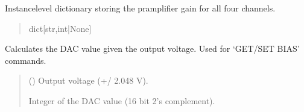 \documentclass[letterpaper,10pt,english]{sphinxmanual}
\begin{document}
\begin{fulllineitems}
\begin{fulllineitems}
\begin{quote}
\begin{description}
\end{description}\end{quote}

\end{fulllineitems}


\begin{fulllineitems}
\label{\detokenize{PodDevice_8401HR:PodDevice_8401HR.POD_8401HR._preampGain}}
\pysigstartsignatures
{}
\pysigstopsignatures
\sphinxAtStartPar
Instance\sphinxhyphen{}level dictionary storing the pramplifier gain for             all four channels.
\begin{quote}\begin{description}
\sphinxAtStartPar
dict{[}str,int|None{]}

\end{description}\end{quote}

\end{fulllineitems}


\begin{fulllineitems}
\label{\detokenize{PodDevice_8401HR:PodDevice_8401HR.POD_8401HR.CalculateBiasDAC_GetDACValue}}
\pysigstartsignatures
{}
\pysigstopsignatures
\sphinxAtStartPar
Calculates the DAC value given the output voltage. Used for ‘GET/SET BIAS’ commands.
\begin{quote}\begin{description}
\sphinxAtStartPar
{} (\sphinxstyleliteralemphasis{\sphinxupquote{ | }}) \textendash{} Output voltage (+/\sphinxhyphen{} 2.048 V).

\sphinxAtStartPar
Integer of the DAC value (16 bit 2’s complement).


\end{description}
\end{quote}
\end{fulllineitems}
\end{fulllineitems}
\end{document}
